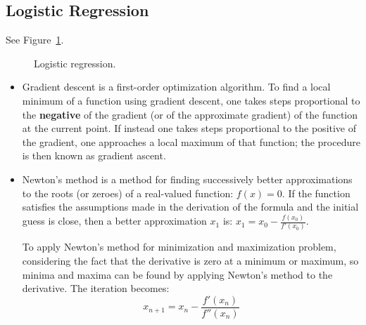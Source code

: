 \subsection{Logistic Regression}
 See Figure~\ref{fig:logistic}.
\begin{figure}[t]
	\caption{Logistic regression.}
	\label{fig:logistic}
\end{figure}

\begin{itemize}
\item {} Gradient descent is a first-order optimization algorithm. To find a local minimum of a function using gradient descent, one takes steps proportional to the \textbf{negative} of the gradient (or of the approximate gradient) of the function at the current point. If instead one takes steps proportional to the positive of the gradient, one approaches a local maximum of that function; the procedure is then known as gradient ascent.

\item {} Newton's method is a method for finding successively better approximations to the roots (or zeroes) of a real-valued function: $f(x) = 0$. If the function satisfies the assumptions made in the derivation of the formula and the initial guess is close, then a better approximation $x_1$ is: $x_1 = x_0 - \frac{f(x_0)}{f'(x_0)}$.

To apply Newton's method for minimization and maximization problem, considering the fact that the derivative is zero at a minimum or maximum, so minima and maxima can be found by applying Newton's method to the derivative. The iteration becomes:
\[
x_{n+1} = x_n - \frac{f'(x_n)}{f''(x_n)}
\]
\end{itemize}

